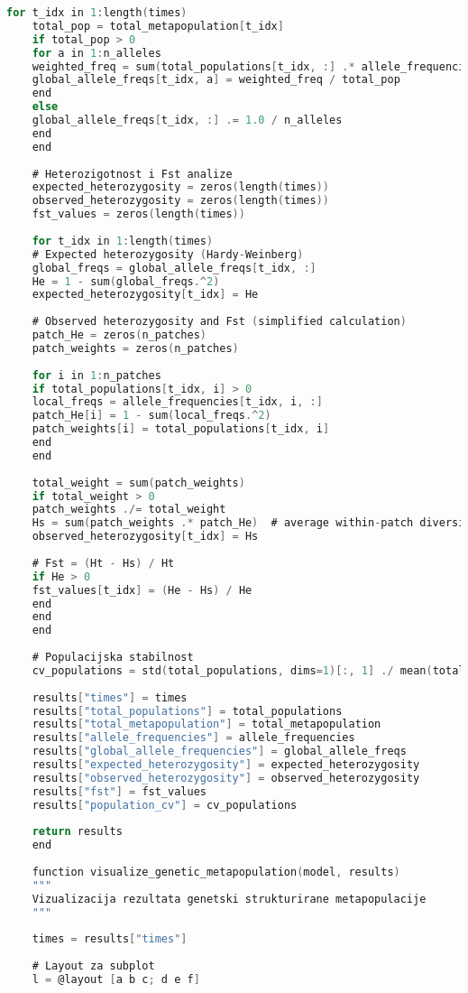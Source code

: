\documentclass[11pt,oneside]{book}
\begin{document}
\begin{lstlisting}[language=C, caption=Julia implementacija genetski strukturiranog metapopulacijskog modela]
	for t_idx in 1:length(times)
	total_pop = total_metapopulation[t_idx]
	if total_pop > 0
	for a in 1:n_alleles
	weighted_freq = sum(total_populations[t_idx, :] .* allele_frequencies[t_idx, :, a])
	global_allele_freqs[t_idx, a] = weighted_freq / total_pop
	end
	else
	global_allele_freqs[t_idx, :] .= 1.0 / n_alleles
	end
	end
	
	# Heterozigotnost i Fst analize
	expected_heterozygosity = zeros(length(times))
	observed_heterozygosity = zeros(length(times))
	fst_values = zeros(length(times))
	
	for t_idx in 1:length(times)
	# Expected heterozygosity (Hardy-Weinberg)
	global_freqs = global_allele_freqs[t_idx, :]
	He = 1 - sum(global_freqs.^2)
	expected_heterozygosity[t_idx] = He
	
	# Observed heterozygosity and Fst (simplified calculation)
	patch_He = zeros(n_patches)
	patch_weights = zeros(n_patches)
	
	for i in 1:n_patches
	if total_populations[t_idx, i] > 0
	local_freqs = allele_frequencies[t_idx, i, :]
	patch_He[i] = 1 - sum(local_freqs.^2)
	patch_weights[i] = total_populations[t_idx, i]
	end
	end
	
	total_weight = sum(patch_weights)
	if total_weight > 0
	patch_weights ./= total_weight
	Hs = sum(patch_weights .* patch_He)  # average within-patch diversity
	observed_heterozygosity[t_idx] = Hs
	
	# Fst = (Ht - Hs) / Ht
	if He > 0
	fst_values[t_idx] = (He - Hs) / He
	end
	end
	end
	
	# Populacijska stabilnost
	cv_populations = std(total_populations, dims=1)[:, 1] ./ mean(total_populations, dims=1)[:, 1]
	
	results["times"] = times
	results["total_populations"] = total_populations
	results["total_metapopulation"] = total_metapopulation
	results["allele_frequencies"] = allele_frequencies
	results["global_allele_frequencies"] = global_allele_freqs
	results["expected_heterozygosity"] = expected_heterozygosity
	results["observed_heterozygosity"] = observed_heterozygosity
	results["fst"] = fst_values
	results["population_cv"] = cv_populations
	
	return results
	end
	
	function visualize_genetic_metapopulation(model, results)
	"""
	Vizualizacija rezultata genetski strukturirane metapopulacije
	"""
	
	times = results["times"]
	
	# Layout za subplot
	l = @layout [a b c; d e f]
	

\end{lstlisting}
\end{document}
